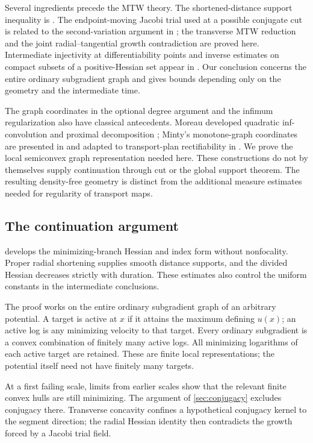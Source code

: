 Several ingredients precede the MTW theory. The shortened-distance
support inequality is \cite[Claim~2.4]{CMS2001}. The endpoint-moving
Jacobi trial used at a possible conjugate cut is related to the
second-variation argument in \cite[Proposition~2.5]{CMS2001}; the
transverse MTW reduction and the joint radial--tangential growth
contradiction are proved here. Intermediate injectivity at
differentiability points and inverse estimates on compact subsets of a
positive-Hessian set appear in \cite[Lemma~5.3 and Claim~5.6]{CMS2001}.
Our conclusion concerns the entire ordinary subgradient graph and gives
bounds depending only on the geometry and the intermediate time.

The graph coordinates in the optional degree argument and the infimum
regularization also have classical
antecedents. Moreau developed quadratic inf-convolution and proximal
decomposition \cite[Sections~3--5, 7 and~12]{Moreau1965}; Minty's
monotone-graph coordinates are presented in
\cite[Proposition~1.1]{AA1999} and adapted to transport-plan
rectifiability in \cite[Section~2]{MPW2012}. We prove the local
semiconvex graph representation needed here. These constructions do not
by themselves supply continuation through cut or the global
support theorem. The resulting density-free geometry is distinct from
the additional measure estimates needed for regularity of transport
maps.

\subsection{The continuation argument}

 develops the minimizing-branch Hessian and index
form without nonfocality. Proper radial shortening supplies smooth
distance supports, and the divided Hessian decreases strictly with
duration. These estimates also control the uniform constants in the
intermediate conclusions.

The proof works on the entire ordinary subgradient graph of an arbitrary
potential. A target is active at $x$ if it attains the maximum defining
$u(x)$; an active log is any minimizing velocity to that target.
Every ordinary subgradient is a convex combination of finitely many
active logs. All minimizing logarithms of each active target are retained.
These are finite local representations; the
potential itself need not have finitely many targets.

At a first failing scale, limits from earlier scales show that the
relevant finite convex hulls are still minimizing. The argument of
\cref{sec:conjugacy} excludes conjugacy there. Transverse concavity
confines a hypothetical conjugacy kernel to the segment direction;
the radial Hessian identity then contradicts the growth forced by a
Jacobi trial field.

